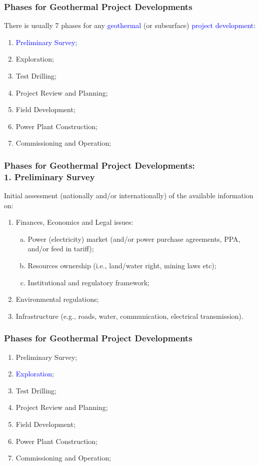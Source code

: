 \documentclass[10pt,compress]{beamer}
\newcommand{\blue}{\textcolor{blue}}
\begin{document}
\begin{frame}
 \frametitle{Phases for Geothermal Project Developments} 
    There is usually 7 phases for any \blue{geothermal} (or subsurface) \blue{project development}: 
    \begin{enumerate}[1.]
       \item <1-> \blue{Preliminary Survey;}
       \item <1-> Exploration; 
       \item <1-> Test Drilling;
       \item <1-> Project Review and Planning;
       \item <1-> Field Development; 
       \item <1-> Power Plant Construction;
       \item <1-> Commissioning and Operation;
    \end{enumerate}
\end{frame}

\begin{frame}
 \frametitle{Phases for Geothermal Project Developments: \\1. Preliminary Survey} 

    Initial assessment (nationally and/or internationally) of the available information on:
    \begin{enumerate}[{1.}1]
       \item <1-> Finances, Economics and Legal issues:
          \begin{enumerate}[(a)]
             \item<2-> Power (electricity) market (and/or power purchase agreements, PPA, and/or feed in tariff);
             \item<2-> Resources ownership (i.e., land/water right, mining laws etc);
             \item<2-> Institutional and regulatory framework;
          \end{enumerate}
       \item <3-> Environmental regulations; 
       \item <4-> Infrastructure (e.g., roads, water, communication, electrical transmission).
    \end{enumerate}
\end{frame}

\begin{frame}
 \frametitle{Phases for Geothermal Project Developments} 
    \begin{enumerate}[1.]
       \item <1-> Preliminary Survey;
       \item <2-> \blue{Exploration}; 
       \item <1-> Test Drilling;
       \item <1-> Project Review and Planning;
       \item <1-> Field Development; 
       \item <1-> Power Plant Construction;
       \item <1-> Commissioning and Operation;
    \end{enumerate}
\end{frame}
\end{document}
